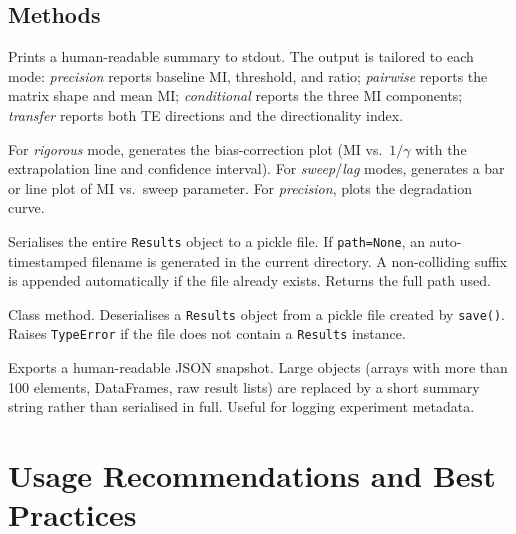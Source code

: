 \documentclass[12pt]{article}
\newcommand{\api}[1]{\texttt{#1}}
\begin{document}
\subsection{Methods}

\begin{description}[style=nextline, leftmargin=1.5cm]
  \item[\api{summary()}]
    Prints a human-readable summary to stdout.  The output is tailored to
    each mode: \textit{precision} reports baseline MI, threshold, and ratio;
    \textit{pairwise} reports the matrix shape and mean MI; \textit{conditional}
    reports the three MI components; \textit{transfer} reports both TE
    directions and the directionality index.

  \item[\api{plot()}]
    For \textit{rigorous} mode, generates the bias-correction plot (MI vs.\
    $1/\gamma$ with the extrapolation line and confidence interval).  For
    \textit{sweep}/\textit{lag} modes, generates a bar or line plot of MI
    vs.\ sweep parameter.  For \textit{precision}, plots the degradation
    curve.

  \item[\api{save(path=None) \to str}]
    Serialises the entire \api{Results} object to a pickle file.
    If \api{path=None}, an auto-timestamped filename is generated in the
    current directory.  A non-colliding suffix is appended automatically
    if the file already exists.  Returns the full path used.

  \item[\api{load(path) \to Results}]
    Class method.  Deserialises a \api{Results} object from a pickle file
    created by \api{save()}.  Raises \api{TypeError} if the file does not
    contain a \api{Results} instance.

  \item[\api{to\_json(path=None) \to str}]
    Exports a human-readable JSON snapshot.  Large objects (arrays with more
    than 100 elements, DataFrames, raw result lists) are replaced by a
    short summary string rather than serialised in full.  Useful for logging
    experiment metadata.

\end{description}

\section{Usage Recommendations and Best Practices}
\label{sec:usage}
\end{document}
